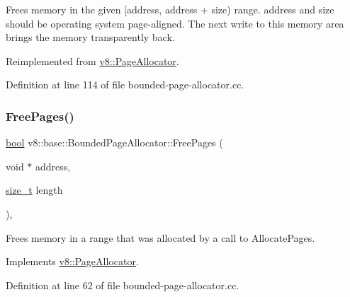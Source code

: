 Frees memory in the given \mbox{[}address, address + size) range. address and size should be operating system page-\/aligned. The next write to this memory area brings the memory transparently back. 

Reimplemented from \mbox{\hyperlink{classv8_1_1PageAllocator_ad0de847c922e25f63d82494d997f441d}{v8\+::\+Page\+Allocator}}.



Definition at line 114 of file bounded-\/page-\/allocator.\+cc.

\mbox{\label{classv8_1_1base_1_1BoundedPageAllocator_a52bf55c7bd934bd67982d37691c15573}} 
\subsubsection{\texorpdfstring{Free\+Pages()}{FreePages()}}
{\footnotesize\ttfamily \mbox{\hyperlink{classbool}{bool}} v8\+::base\+::\+Bounded\+Page\+Allocator\+::\+Free\+Pages (\begin{DoxyParamCaption}\item[{void $\ast$}]{address,  }\item[{\mbox{\hyperlink{classsize__t}{size\+\_\+t}}}]{length }\end{DoxyParamCaption})\hspace{0.3cm}{\ttfamily [override]}, {\ttfamily [virtual]}}

Frees memory in a range that was allocated by a call to Allocate\+Pages. 

Implements \mbox{\hyperlink{classv8_1_1PageAllocator_abc2e3fdc768aba7d35ce0cf44f14586c}{v8\+::\+Page\+Allocator}}.



Definition at line 62 of file bounded-\/page-\/allocator.\+cc.

\mbox{\label{classv8_1_1base_1_1BoundedPageAllocator_aafb1cb9ac6fed20bdba0806a46f28bfc}} 
